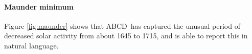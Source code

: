 \documentclass[letterpaper]{article}
\newcommand{\procedurename}{ABCD\ }
\begin{document}




\paragraph{Maunder minimum}

Figure \ref{fig:maunder} shows that \procedurename has captured the unusual period of decreased solar activity from about 1645 to 1715, and is able to report this in natural language.
\end{document}
